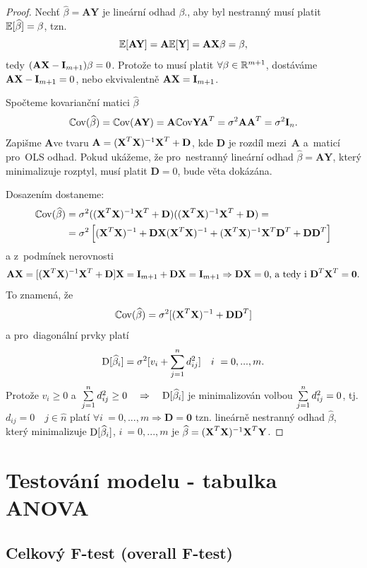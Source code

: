 \begin{proof}
	Nechť $\widehat{\beta} = \textbf{AY}$ je lineární odhad $\beta$., aby byl nestranný musí platit $\mathbb{E} [\widehat{\beta}] = \beta$, tzn. $$ \mathbb{E} [\textbf{AY}] = \textbf{A} \mathbb{E} [\textbf{Y}] = \textbf{A} \textbf{X} \beta = \beta, $$
	tedy $(\textbf{A} \textbf{X} - \textbf{I}_{m+1}) \beta = 0$. Protože to musí platit $\forall \beta \in \mathbb{R}^{m+1}$, dostáváme $\textbf{A} \textbf{X} - \textbf{I}_{m+1} = 0$, nebo ekvivalentně $\textbf{A} \textbf{X} = \textbf{I}_{m+1}$.
	
	Spočteme kovarianční matici $\widehat{\beta}$
 $$
	\mathbb{C}\mathrm{ov}(\widehat{\beta}) = \mathbb{C}\mathrm{ov}(\textbf{AY}) = \textbf{A} \mathbb{C}\mathrm{ov} \textbf{YA}^T = \sigma^2\textbf{AA}^T = \sigma^2 \textbf{I}_n.
 $$
Zapišme \textbf{A}ve tvaru $\textbf{A} = (\textbf{X}^T \textbf{X})^{-1} \textbf{X}^T + \textbf{D}$, kde \textbf{D} je rozdíl mezi~\textbf{A} a~maticí pro~OLS odhad.
Pokud ukážeme, že pro~nestranný lineární odhad $\widehat{\beta} = \textbf{AY}$, který minimalizuje rozptyl, musí platit $\textbf{D} = 0$, bude věta dokázána.

Dosazením dostaneme:
\begin{align*}
	\mathbb{C}\mathrm{ov}(\widehat{\beta}) & = \sigma^2 ((\textbf{X}^T \textbf{X})^{-1} \textbf{X}^T + \textbf{D}) ((\textbf{X}^T \textbf{X})^{-1} \textbf{X}^T + \textbf{D}) = \\
& = \sigma^2 \left[(\textbf{X}^T \textbf{X})^{-1} + \textbf{D} \textbf{X} (\textbf{X}^T \textbf{X})^{-1} + (\textbf{X}^T \textbf{X})^{-1} \textbf{X}^T \textbf{D}^T + \textbf{DD}^T \right]
\end{align*}
a z~podmínek nerovnosti
 $$
\textbf{A} \textbf{X} = [(\textbf{X}^T \textbf{X})^{-1} \textbf{X}^T + \textbf{D}] \textbf{X} = \textbf{I}_{m+1} + \textbf{D} \textbf{X} = \textbf{I}_{m+1}  \Rightarrow  \textbf{D} \textbf{X} = 0 \text{, a~tedy i~} \textbf{D}^T \textbf{X}^T = \textbf{0}.
 $$
To znamená, že
 $$
\mathbb{C}\mathrm{ov}(\widehat{\beta}) = \sigma^2 [(\textbf{X}^T \textbf{X})^{-1} + \textbf{DD}^T]
 $$
a pro~diagonální prvky platí
 $$
\mathrm{D} [\widehat{\beta}_i] = \sigma^2 [v_i + \sum\limits_{j=1}^{n} d_{ij}^2] \quad i~ = 0,..., m.
 $$
Protože $v_i \geq 0$ a~$\sum\limits_{j=1}^{n} d_{ij}^2 \geq 0 \quad \Rightarrow \quad \mathrm{D} [\widehat{\beta}_i]$ je minimalizován volbou $\sum\limits_{j=1}^{n} d_{ij}^2 = 0$, tj. $d_{ij} = 0 \quad j  \in\widehat{n} $ platí $\forall i~ = 0,..., m \Rightarrow \textbf{D} = \textbf{0}$ tzn. lineárně nestranný odhad $\widehat{\beta}$, který minimalizuje $\mathrm{D} [\widehat{\beta}_i]$, $i~ = 0,..., m$ je $\widehat{\beta} = (\textbf{X}^T \textbf{X})^{-1} \textbf{X}^T \textbf{Y}$.
\end{proof}
\section{Testování modelu - tabulka ANOVA}
\subsection{Celkový F-test (overall F-test)}

